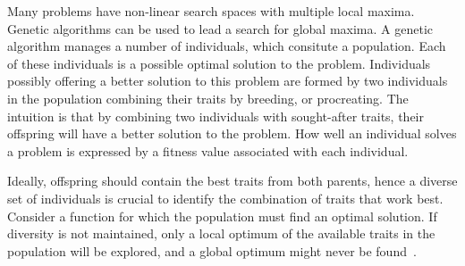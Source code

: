 Many problems have non-linear search spaces with multiple local maxima. Genetic algorithms can be used to lead a search for global maxima. A genetic algorithm manages a number of individuals, which consitute a population. Each of these individuals is a possible optimal solution to the problem. Individuals possibly offering a better solution to this problem are formed by two individuals in the population combining their traits by breeding, or procreating. The intuition is that by combining two individuals with sought-after traits, their offspring will have a better solution to the problem. How well an individual solves a problem is expressed by a fitness value associated with each individual.

Ideally, offspring should contain the best traits from both parents, hence a diverse set of individuals is crucial to identify the combination of traits that work best. Consider a function for which the population must find an optimal solution. If diversity is not maintained, only a local optimum of the available traits in the population will be explored, and a global optimum might never be found~\cite{ursem2002diversity}.



